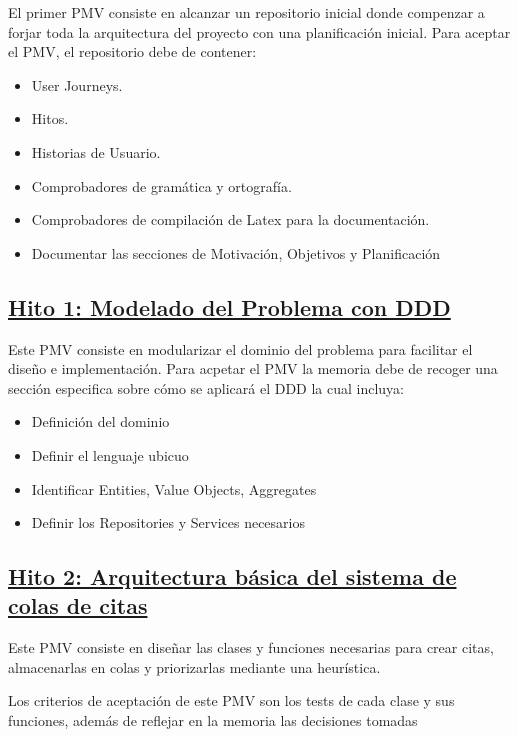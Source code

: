 El primer PMV consiste en alcanzar un repositorio inicial donde compenzar a forjar toda la arquitectura del proyecto con una planificación inicial.
Para aceptar el PMV, el repositorio debe de contener:

\begin{itemize}
    \item{User Journeys.}
    \item{Hitos.}
    \item{Historias de Usuario.}
    \item{Comprobadores de gramática y ortografía.}
    \item{Comprobadores de compilación de Latex para la documentación.}
    \item{Documentar las secciones de Motivación, Objetivos y Planificación}
\end{itemize}

\subsection*{\href{https://github.com/RubenDelgadoPareja/TFG-Triage-Inteligente-Consulta-Medica/milestone/7}{Hito 1: Modelado del Problema con DDD}}

Este PMV consiste en modularizar el dominio del problema para facilitar el diseño e implementación.
Para acpetar el PMV la memoria debe de recoger una sección especifica sobre cómo se aplicará el DDD la cual incluya: 

\begin{itemize}
    \item {Definición del dominio}
    \item {Definir el lenguaje ubicuo}
    \item {Identificar Entities, Value Objects, Aggregates}
    \item {Definir los Repositories y Services necesarios}
\end{itemize}


\subsection*{\href{https://github.com/RubenDelgadoPareja/TFG-Triage-Inteligente-Consulta-Medica/milestone/2}{Hito 2: Arquitectura básica del sistema de colas de citas}}

Este PMV consiste en diseñar las clases y funciones necesarias para crear citas, almacenarlas en colas y priorizarlas mediante una heurística.

Los criterios de aceptación de este PMV son los tests de cada clase y sus funciones, además de reflejar en la memoria las decisiones tomadas

